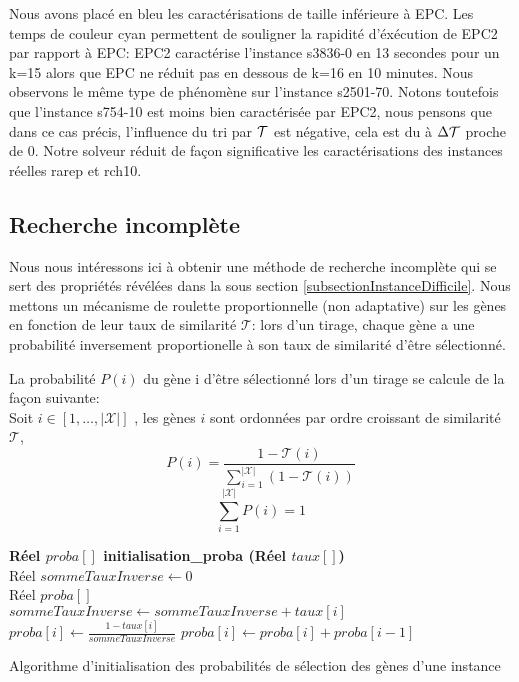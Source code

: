 Nous avons placé en bleu les caractérisations de taille inférieure à EPC. Les temps de couleur cyan permettent de souligner la rapidité d'éxécution de EPC2 par rapport à EPC:  EPC2 caractérise l'instance s3836-0 en 13 secondes pour un k=15 alors que EPC ne réduit pas en dessous de k=16 en 10 minutes. Nous observons le même type de phénomène sur l'instance s2501-70. Notons toutefois que l'instance s754-10 est moins bien caractérisée par EPC2, nous pensons que dans ce cas précis, l'influence du tri par $\cal{T}$ est négative, cela est du à $\Delta\cal{T}$ proche de 0. Notre solveur réduit de façon significative les caractérisations des instances réelles rarep et rch10. 


\subsection{Recherche incomplète}

Nous nous intéressons ici à obtenir une méthode de recherche incomplète qui se sert des propriétés révélées dans la sous section \ref{subsectionInstanceDifficile}. Nous mettons un mécanisme de roulette proportionnelle (non adaptative) sur les gènes en fonction de leur taux de similarité $\mathcal{T}$: lors d'un tirage, chaque gène a une probabilité inversement proportionelle à son taux de similarité d'être sélectionné.

\begin{definition}{}
\label{defProbaGene}
La probabilité $P(i)$ du gène i d'être sélectionné lors d'un tirage se calcule de la façon suivante:\\
Soit $i \in [1,\ldots,|\mathcal{X}|]$ , les gènes $i$ sont ordonnées par ordre croissant de similarité $\mathcal{T}$,
$$ P(i)=\frac{1-\mathcal{T}(i)}{\sum_{i=1}^{|\mathcal{X}|} (1-\mathcal{T}(i))} $$
$$ \sum_{i=1}^{|\mathcal{X}|} P(i) = 1$$
\end{definition}

\begin{algorithm}
	\textbf{Réel $proba[]$ initialisation\_proba (Réel $taux[]$)}\\
	Réel $sommeTauxInverse \leftarrow 0$\\
	Réel $proba[]$\\
	
	\PourTous {$i \in [1,\ldots,|\mathcal{X}|$ } 
	{
		$sommeTauxInverse \leftarrow sommeTauxInverse + taux[i]$
	}	
	\PourTous {$i \in [1,\ldots,|\mathcal{X}|$ } 
	{
		$proba[i] \leftarrow \frac{1-taux[i]}{sommeTauxInverse}$
	}
	\PourTous {$i \in [2,\ldots,|\mathcal{X}|$ } 
	{
		$proba[i] \leftarrow proba[i]+proba[i-1]$
	}
	\caption{Algorithme d'initialisation des probabilités de sélection des gènes d'une instance}
	\label{algoInitialiseProba}
\end{algorithm}

